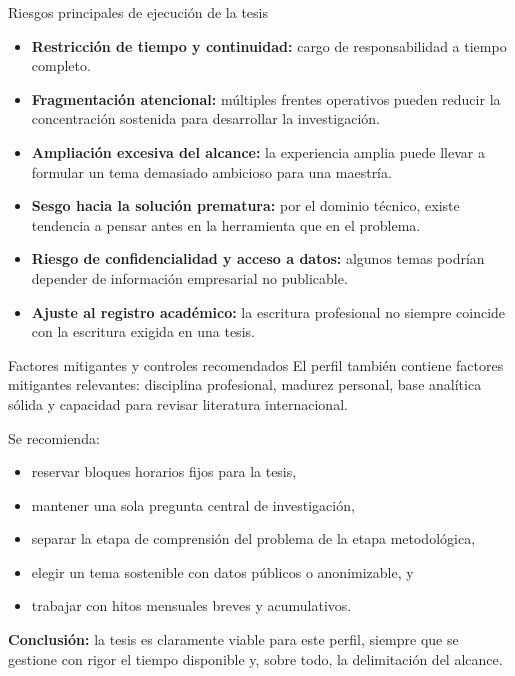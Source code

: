 \documentclass[aspectratio=169]{beamer}
\begin{document}
\begin{frame}{Riesgos principales de ejecución de la tesis}
\justifying
\begin{itemize}[leftmargin=*]
    \item \textbf{Restricción de tiempo y continuidad:} cargo de responsabilidad a tiempo completo.
    \item \textbf{Fragmentación atencional:} múltiples frentes operativos pueden reducir la concentración sostenida para desarrollar la investigación.
    \item \textbf{Ampliación excesiva del alcance:} la experiencia amplia puede llevar a formular un tema demasiado ambicioso para una maestría.
    \item \textbf{Sesgo hacia la solución prematura:} por el dominio técnico, existe tendencia a pensar antes en la herramienta que en el problema.
    \item \textbf{Riesgo de confidencialidad y acceso a datos:} algunos temas podrían depender de información empresarial no publicable.
    \item \textbf{Ajuste al registro académico:} la escritura profesional no siempre coincide con la escritura exigida en una tesis.
\end{itemize}
\end{frame}

\begin{frame}{Factores mitigantes y controles recomendados}
\justifying
El perfil también contiene factores mitigantes relevantes: disciplina profesional, madurez personal, base analítica sólida y capacidad para revisar literatura internacional.

\vspace{0.5em}
Se recomienda:
\begin{itemize}[leftmargin=*]
    \item reservar bloques horarios fijos para la tesis,
    \item mantener una sola pregunta central de investigación,
    \item separar la etapa de comprensión del problema de la etapa metodológica,
    \item elegir un tema sostenible con datos públicos o anonimizable, y
    \item trabajar con hitos mensuales breves y acumulativos.
\end{itemize}

\vspace{0.5em}
\textbf{Conclusión:} la tesis es claramente viable para este perfil, siempre que se gestione con rigor el tiempo disponible y, sobre todo, la delimitación del alcance.
\end{frame}
\end{document}
